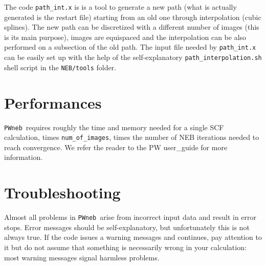 \documentclass[12pt,a4paper]{article}
\def\NEB{\texttt{PWneb}} %
\begin{document}
The code \texttt{path\_int.x} is
is a tool to generate a new path (what is actually
generated is the restart file) starting from an old one through
interpolation (cubic splines). The new path can be discretized with a
different number of images (this is its main purpose), images are
equispaced and the interpolation can be also
performed on a subsection of the old path. The input file needed by
\texttt{path\_int.x} can be easily set up  with the help of the self-explanatory
\texttt{path\_interpolation.sh} shell script in the \texttt{NEB/tools} folder.


\section{Performances}

\NEB \ requires roughly the time and memory 
needed for a single SCF calculation, times
\texttt{num\_of\_images}, times the number 
of NEB iterations needed to reach convergence.
We
refer the reader to the PW user\_guide for more information.

\section{Troubleshooting}

Almost all problems in \NEB \ arise from incorrect input data 
and result in
error stops. Error messages should be self-explanatory, but unfortunately
this is not always true. If the code issues a warning messages and continues,
pay attention to it but do not assume that something is necessarily wrong in
your calculation: most warning messages signal harmless problems.
\end{document}
